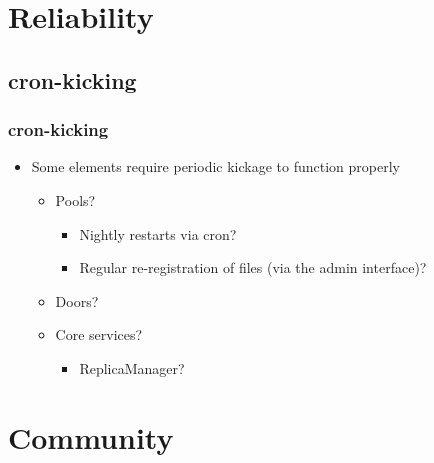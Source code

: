 \documentclass{beamer}
\begin{document}
\section{Reliability}
\subsection{cron-kicking}
\begin{frame}
\frametitle{cron-kicking}
\begin{itemize}
    \item Some elements require periodic kickage to function properly
    \begin{itemize}
        \item Pools?
        \begin{itemize}
            \item Nightly restarts via cron?
            \item Regular re-registration of files (via the admin interface)?
        \end{itemize}
        \item Doors?
        \item Core services?
        \begin{itemize}
            \item ReplicaManager?
        \end{itemize}
    \end{itemize}
\end{itemize}
\end{frame}

\section{Community}
\end{document}
